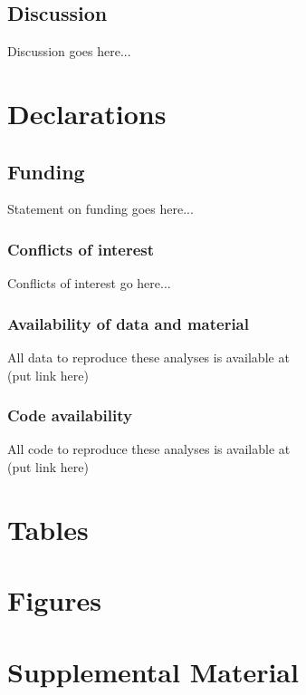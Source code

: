 \documentclass[12pt]{article}
\begin{document}
\subsection*{Discussion}

Discussion goes here...








\clearpage

\section*{Declarations}

\subsection*{Funding}
Statement on funding goes here...

\subsubsection*{Conflicts of interest}
Conflicts of interest go here...

\subsubsection*{Availability of data and material}
All data to reproduce these analyses is available at \\
(put link here)

\subsubsection*{Code availability}
All code to reproduce these analyses is available at \\
(put link here)



\clearpage



\clearpage


\section*{Tables}

\clearpage

\section*{Figures}






\clearpage
\newcommand{\beginsupplement}{%
        \setcounter{page}{1}
        \setcounter{table}{0}
        \renewcommand{\thetable}{S\arabic{table}}%
        \setcounter{figure}{0}
        \renewcommand{\thefigure}{S\arabic{figure}}%
        }

\section*{Supplemental Material}

\beginsupplement
\end{document}

